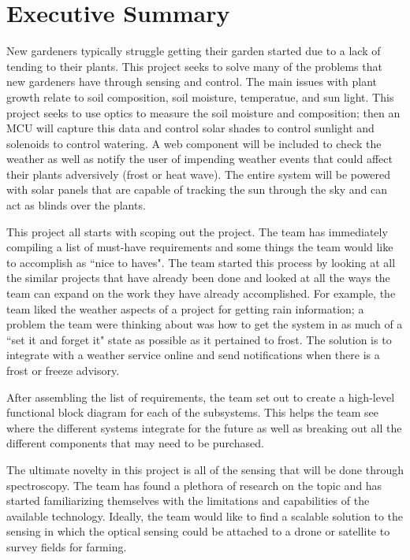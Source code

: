 \documentclass[12pt]{article}
\begin{document}

\tableofcontents
\listoffigures
\listoftables
\pagebreak
{}
%
\section{Executive Summary}
New gardeners typically struggle getting their garden started due to a lack of tending to their plants. This project seeks to solve  many of the problems that new gardeners have through sensing and control. The main issues with plant growth relate to soil composition, soil moisture, temperatue, and sun light. This project seeks to use optics to measure the soil moisture and composition; then an MCU will capture this data and control solar shades to control sunlight and solenoids to control watering. A web component will be included to check the weather as well as notify the user of impending weather events that could affect their plants adversively (frost or heat wave). The entire system will be powered with solar panels that are capable of tracking the sun through the sky and can act as blinds over the plants.

This project all starts with scoping out the project. The team has immediately compiling a list of must-have requirements and some things the team would like to accomplish as ``nice to haves". The team started this process by looking at all the similar projects that have already been done and looked at all the ways the team can expand on the work they have already accomplished. For example, the team liked the weather aspects of a project for getting rain information; a problem the team were thinking about was how to get the system in as much of a ``set it and forget it" state as possible as it pertained to frost. The solution is to integrate with a weather service online and send notifications when there is a frost or freeze advisory.

After assembling the list of requirements, the team set out to create a high-level functional block diagram for each of the subsystems. This helps the team see where the different systems integrate for the future as well as breaking out all the different components that may need to be purchased.

The ultimate novelty in this project is all of the sensing that will be done through spectroscopy. The team has found a plethora of research on the topic and has started familiarizing themselves with the limitations and capabilities of the available technology. Ideally, the team would like to find a scalable solution to the sensing in which the optical sensing could be attached to a drone or satellite to survey fields for farming.
\end{document}
